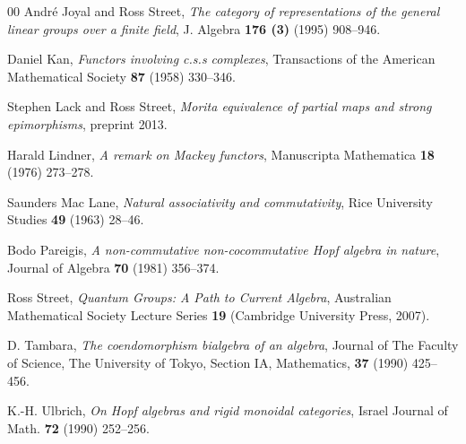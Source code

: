 \documentclass[a4paper,12pt,reqno]{amsart}
\theoremstyle{definition}
\theoremstyle{fact}
\theoremstyle{genquest}
\theoremstyle{step}
\begin{document}
\begin{thebibliography}{00}
 Andr\'e Joyal and Ross Street, \textit{The category of representations of the general linear groups over a finite field}, J. Algebra \textbf{176 (3)} (1995) 908--946.\label{repfgl}

 Daniel Kan, \textit{Functors involving c.s.s complexes}, Transactions of the American Mathematical Society \textbf{87} (1958) 330--346.\label{Kan}

 Stephen Lack and Ross Street, \textit{Morita equivalence of partial maps and strong epimorphisms}, preprint 2013.\label{PMSE}

 Harald Lindner, \textit{A remark on Mackey functors}, Manuscripta Mathematica \textbf{18} (1976) 273--278.\label{Lindner1976}

 Saunders Mac Lane, \textit{Natural associativity and commutativity}, Rice University Studies \textbf{49} (1963) 28--46.\label{ML1963}

 Bodo Pareigis, \textit{A non-commutative non-cocommutative Hopf algebra in nature}, Journal of Algebra \textbf{70} (1981) 356--374.\label{NHA}

 Ross Street, \textit{Quantum Groups: A Path to Current Algebra}, Australian Mathematical Society Lecture Series \textbf{19} (Cambridge University Press, 2007).\label{QG} 

 D. Tambara, \textit{The coendomorphism bialgebra of an algebra}, Journal of The Faculty of Science, The University of Tokyo, Section IA, Mathematics, \textbf{37} (1990) 425--456.\label{CBA}

 K.-H. Ulbrich, \textit{On Hopf algebras and rigid monoidal categories}, Israel Journal of 
Math. \textbf{72} (1990) 252--256.\label{Ulbrich}

\end{thebibliography}
\end{document}
